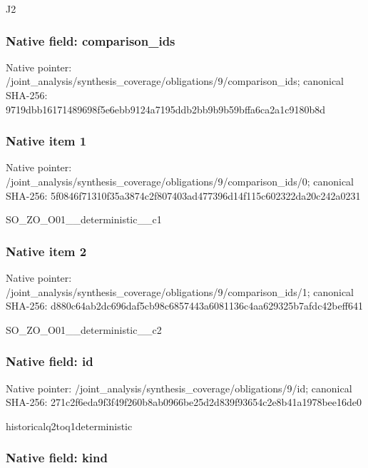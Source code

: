 \documentclass[10pt,a4paper]{article}
\begin{document}
J2


\subsubsection{Native field: comparison\_ids}


Native pointer: /joint\_analysis/synthesi\allowbreak{}s\_coverage/obligations/9\allowbreak{}/comparison\_ids; canonical SHA-256: 9719dbb16171489698f5e6eb\allowbreak{}b9124a7195ddb2bb9b9b59bf\allowbreak{}fa6ca2a1c9180b8d



\subsubsection{Native item 1}


Native pointer: /joint\_analysis/synthesi\allowbreak{}s\_coverage/obligations/9\allowbreak{}/comparison\_ids/0; canonical SHA-256: 5f0846f71310f35a3874c2f8\allowbreak{}07403ad477396d14f115c602\allowbreak{}322da20c242a0231


SO\_ZO\_O01\_\_deterministic\_\_c1


\subsubsection{Native item 2}


Native pointer: /joint\_analysis/synthesi\allowbreak{}s\_coverage/obligations/9\allowbreak{}/comparison\_ids/1; canonical SHA-256: d880c64ab2dc696daf5cb98c\allowbreak{}6857443a6081136c4aa62932\allowbreak{}5b7afdc42beff641


SO\_ZO\_O01\_\_deterministic\_\_c2


\subsubsection{Native field: id}


Native pointer: /joint\_analysis/synthesi\allowbreak{}s\_coverage/obligations/9\allowbreak{}/id; canonical SHA-256: 271c2f6eda9f3f49f260b8ab\allowbreak{}0966be25d2d839f93654c2e8\allowbreak{}b41a1978bee16de0


historicalq2toq1deterministic


\subsubsection{Native field: kind}
\end{document}
